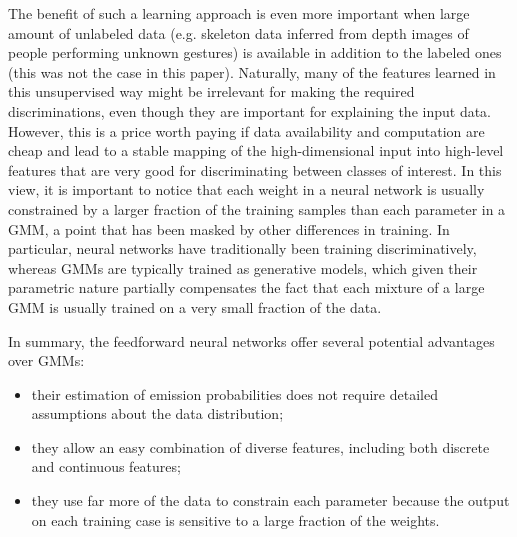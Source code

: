 The benefit of such a learning approach is even more important when large amount of unlabeled data (e.g. skeleton data
 inferred from depth images of people performing unknown gestures) is available in addition to the labeled ones
(this was not the case in this paper).
%
%
Naturally, many of the  features learned in this unsupervised way might  be irrelevant for making the required discriminations,
even though they are important for explaining the input data.
However, this is a price worth paying if data availability and computation are cheap and
lead to  a stable mapping of the high-dimensional input  into high-level features
that are very good for discriminating between classes of interest.
%
In this view, it is important to notice that each weight in a neural network is usually constrained by a larger fraction of
the training samples than each parameter in a GMM, a point that has been masked by other differences in training.
In particular,  neural networks have traditionally been training discriminatively, whereas GMMs are typically trained as generative models,
which given their parametric  nature  partially compensates the fact that each mixture
of a large GMM is usually trained on a very small fraction of the data.

In summary, the feedforward neural networks offer several potential advantages over GMMs:
\begin{itemize}
\item their estimation of emission  probabilities does not require detailed assumptions about the data distribution;
\item they allow an easy combination of diverse features, including both discrete and continuous features;
\item they use far more of the data to constrain each parameter because the output on each training case
is sensitive to a large fraction of the weights.
\end{itemize}




